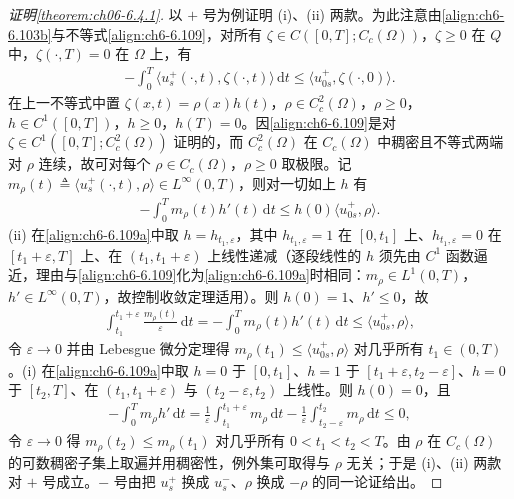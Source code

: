 \documentclass[../../main.tex]{subfiles}%
\begin{document}
\begin{proof}[证明\cref{theorem:ch06-6.4.1}]
以 $+$ 号为例证明 (i)、(ii) 两款。为此注意由\eqref{align:ch6-6.103b}与不等式\eqref{align:ch6-6.109}，对所有 $\zeta\in C([0,T];C_c(\Omega))$，$\zeta\geqslant0$ 在 $Q$ 中，$\zeta(\cdot,T)=0$ 在 $\Omega$ 上，有
\begin{align*}
-\int_0^T\langle u^+_s(\cdot,t),\zeta(\cdot,t)\rangle\,\mathrm{d}t
\leqslant\langle u^+_{0s},\zeta(\cdot,0)\rangle.
\end{align*}
在上一不等式中置 $\zeta(x,t)=\rho(x)h(t)$，$\rho\in C^2_c(\Omega)$，$\rho\geqslant0$，$h\in C^1([0,T])$，$h\geqslant0$，$h(T)=0$。因\eqref{align:ch6-6.109}是对 $\zeta\in C^1([0,T];C^2_c(\Omega))$ 证明的，而 $C^2_c(\Omega)$ 在 $C_c(\Omega)$ 中稠密且不等式两端对 $\rho$ 连续，故可对每个 $\rho\in C_c(\Omega)$，$\rho\geqslant0$ 取极限。记 $m_\rho(t)\triangleq\langle u^+_s(\cdot,t),\rho\rangle\in L^\infty(0,T)$，则对一切如上 $h$ 有
\begin{align}
-\int_0^Tm_\rho(t)h'(t)\,\mathrm{d}t\leqslant h(0)\langle u^+_{0s},\rho\rangle. \label{align:ch6-6.109a}
\end{align}
(ii) 在\eqref{align:ch6-6.109a}中取 $h=h_{t_1,\varepsilon}$，其中 $h_{t_1,\varepsilon}=1$ 在 $[0,t_1]$ 上、$h_{t_1,\varepsilon}=0$ 在 $[t_1+\varepsilon,T]$ 上、在 $(t_1,t_1+\varepsilon)$ 上线性递减（逐段线性的 $h$ 须先由 $C^1$ 函数逼近，理由与\eqref{align:ch6-6.109}化为\eqref{align:ch6-6.109a}时相同：$m_\rho\in L^1(0,T)$，$h'\in L^\infty(0,T)$，故控制收敛定理适用）。则 $h(0)=1$、$h'\leqslant0$，故
\begin{align*}
\int_{t_1}^{t_1+\varepsilon}\frac{m_\rho(t)}{\varepsilon}\,\mathrm{d}t
=-\int_0^Tm_\rho(t)h'(t)\,\mathrm{d}t
\leqslant\langle u^+_{0s},\rho\rangle,
\end{align*}
令 $\varepsilon\to0$ 并由 Lebesgue 微分定理得 $m_\rho(t_1)\leqslant\langle u^+_{0s},\rho\rangle$ 对几乎所有 $t_1\in(0,T)$。(i) 在\eqref{align:ch6-6.109a}中取 $h=0$ 于 $[0,t_1]$、$h=1$ 于 $[t_1+\varepsilon,t_2-\varepsilon]$、$h=0$ 于 $[t_2,T]$、在 $(t_1,t_1+\varepsilon)$ 与 $(t_2-\varepsilon,t_2)$ 上线性。则 $h(0)=0$，且
\begin{align*}
-\int_0^Tm_\rho h'\,\mathrm{d}t
=\frac{1}{\varepsilon}\int_{t_1}^{t_1+\varepsilon}m_\rho\,\mathrm{d}t
-\frac{1}{\varepsilon}\int_{t_2-\varepsilon}^{t_2}m_\rho\,\mathrm{d}t
\leqslant0,
\end{align*}
令 $\varepsilon\to0$ 得 $m_\rho(t_2)\leqslant m_\rho(t_1)$ 对几乎所有 $0<t_1<t_2<T$。由 $\rho$ 在 $C_c(\Omega)$ 的可数稠密子集上取遍并用稠密性，例外集可取得与 $\rho$ 无关；于是 (i)、(ii) 两款对 $+$ 号成立。$-$ 号由把 $u^+_s$ 换成 $u^-_s$、$\rho$ 换成 $-\rho$ 的同一论证给出。
\end{proof}
\end{document}
